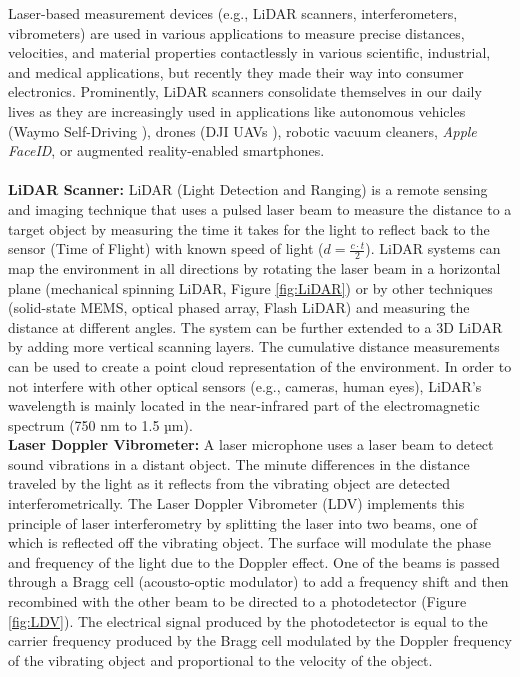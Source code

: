 \documentclass[sigconf, nonacm]{acmart}
\begin{document}
Laser-based measurement devices (e.g., LiDAR scanners, interferometers, vibrometers) are used in various applications to measure precise distances, velocities, and material properties contactlessly in various scientific, industrial, and medical applications, but recently they made their way into consumer electronics.
Prominently, LiDAR scanners consolidate themselves in our daily lives as they are increasingly used in applications like autonomous vehicles (Waymo Self-Driving \cite{WaymoDriver}), drones (DJI UAVs \cite{DJIEnterpriseLidar}), robotic vacuum cleaners, \textit{Apple FaceID}, or augmented reality-enabled smartphones.
\\~\\
\textbf{LiDAR Scanner:} LiDAR (Light Detection and Ranging) is a remote sensing and imaging technique that uses a pulsed laser beam to measure the distance to a target object by measuring the time it takes for the light to reflect back to the sensor (Time of Flight) with known speed of light ($d=\frac{c\cdot t}{2}$).
LiDAR systems can map the environment in all directions by rotating the laser beam in a horizontal plane (mechanical spinning LiDAR, Figure \ref{fig:LiDAR}) or by other techniques (solid-state MEMS, optical phased array, Flash LiDAR) and measuring the distance at different angles. The system can be further extended to a 3D LiDAR by adding more vertical scanning layers.
The cumulative distance measurements can be used to create a point cloud representation of the environment.
In order to not interfere with other optical sensors (e.g., cameras, human eyes), LiDAR's wavelength is mainly located in the near-infrared part of the electromagnetic spectrum (750 nm to 1.5 µm).
\\[6pt]
\textbf{Laser Doppler Vibrometer:} A laser microphone uses a laser beam to detect sound vibrations in a distant object. The minute differences in the distance traveled by the light as it reflects from the vibrating object are detected interferometrically. The Laser Doppler Vibrometer (LDV) implements this principle of laser interferometry by splitting the laser into two beams, one of which is reflected off the vibrating object. The surface will modulate the phase and frequency of the light due to the Doppler effect. One of the beams is passed through a Bragg cell (acousto-optic modulator) to add a frequency shift and then recombined with the other beam to be directed to a photodetector (Figure \ref{fig:LDV}). The electrical signal produced by the photodetector is equal to the carrier frequency produced by the Bragg cell modulated by the Doppler frequency of the vibrating object and proportional to the velocity of the object.
\end{document}
